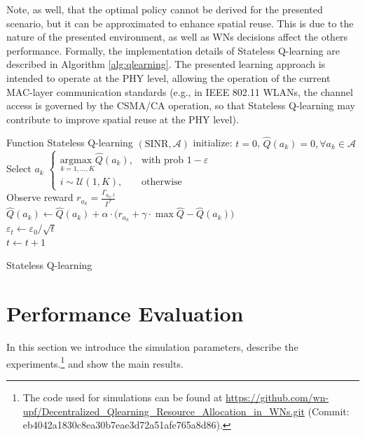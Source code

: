 \documentclass{article}
\begin{document}
	Note, as well, that the optimal policy cannot be derived for the presented scenario, but it can be approximated to enhance spatial reuse. This is due to the nature of the presented environment, as well as WNs decisions affect the others performance.
	Formally, the implementation details of Stateless Q-learning are described in Algorithm \ref{alg:qlearning}.
	The presented learning approach is intended to operate at the PHY level, allowing the operation of the current MAC-layer communication standards (e.g., in IEEE 802.11 WLANs, the channel access is governed by the CSMA/CA operation, so that Stateless Q-learning may contribute to improve spatial reuse at the PHY level).
	\begin{algorithm}
		Function Stateless Q-learning $(\text{SINR},\mathcal{A})$\;
		initialize: $t=0$, $\hat{Q}(a_k) = 0, \forall a_k \in \mathcal{A}$\\
		{
			Select $a_k$  $\begin{cases}
			\underset{k=1,...,K}{\text{argmax }} \hat{Q}(a_k), & \text{with prob } 1 - \varepsilon\\
			i \sim \mathcal{U}(1, K), & \text{otherwise}
			\end{cases}$\\
			Observe reward $r_{a_k} = \frac{\Gamma_{a_k,t}}{\Gamma^*}$ \\
			$\hat{Q}(a_k) \leftarrow \hat{Q}(a_k) + \alpha \cdot \big(r_{a_k} + \gamma \cdot \max\hat{Q} - \hat{Q}(a_k)\big)$\\
			$\varepsilon_t \leftarrow \varepsilon_0 / \sqrt{t}$ \\	
			$ t \leftarrow t + 1$
		}
		\caption{Stateless Q-learning}
		\label{alg:qlearning}
	\end{algorithm}
	
	\section{Performance Evaluation}
	\label{section:performance_evaluation}	
	In this section we introduce the simulation parameters, describe the experiments.\footnote{The code used for simulations can be found at \url{https://github.com/wn-upf/Decentralized_Qlearning_Resource_Allocation_in_WNs.git} (Commit: eb4042a1830c8ea30b7eae3d72a51afe765a8d86).} and show the main results.
	
\end{document}
